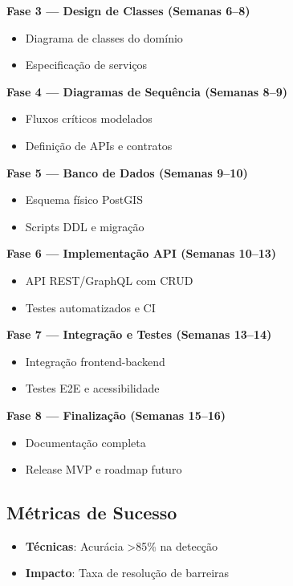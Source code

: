 \documentclass[12pt,a4paper]{article}
\begin{document}
\textbf{Fase 3 — Design de Classes (Semanas 6–8)}
\begin{itemize}
    \item Diagrama de classes do domínio
    \item Especificação de serviços
\end{itemize}

\textbf{Fase 4 — Diagramas de Sequência (Semanas 8–9)}
\begin{itemize}
    \item Fluxos críticos modelados
    \item Definição de APIs e contratos
\end{itemize}

\textbf{Fase 5 — Banco de Dados (Semanas 9–10)}
\begin{itemize}
    \item Esquema físico PostGIS
    \item Scripts DDL e migração
\end{itemize}

\textbf{Fase 6 — Implementação API (Semanas 10–13)}
\begin{itemize}
    \item API REST/GraphQL com CRUD
    \item Testes automatizados e CI
\end{itemize}

\textbf{Fase 7 — Integração e Testes (Semanas 13–14)}
\begin{itemize}
    \item Integração frontend-backend
    \item Testes E2E e acessibilidade
\end{itemize}

\textbf{Fase 8 — Finalização (Semanas 15–16)}
\begin{itemize}
    \item Documentação completa
    \item Release MVP e roadmap futuro
\end{itemize}

\subsection{Métricas de Sucesso}
\begin{itemize}
    \item \textbf{Técnicas}: Acurácia >85\% na detecção
    \item \textbf{Impacto}: Taxa de resolução de barreiras
\end{itemize}
\end{document}
